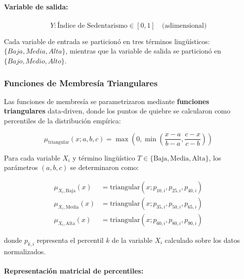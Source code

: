 \paragraph{Variable de salida:}
\begin{equation}
Y: \text{Índice de Sedentarismo} \in [0, 1] \quad \text{(adimensional)}
\label{eq:var_salida}
\end{equation}

Cada variable de entrada se particionó en tres términos lingüísticos: \(\{Baja, Media, Alta\}\), mientras que la variable de salida se particionó en \(\{Bajo, Medio, Alto\}\).

\subsubsection{Funciones de Membresía Triangulares}
\label{subsubsec:funciones_membresia}

Las funciones de membresía se parametrizaron mediante \textbf{funciones triangulares} data-driven, donde los puntos de quiebre se calcularon como percentiles de la distribución empírica:

\begin{equation}
\mu_{\text{triangular}}(x; a, b, c) = \max\left(0, \min\left(\frac{x - a}{b - a}, \frac{c - x}{c - b}\right)\right)
\label{eq:func_triangular}
\end{equation}

Para cada variable \(X_i\) y término lingüístico \(T \in \{\text{Baja}, \text{Media}, \text{Alta}\}\), los parámetros \((a, b, c)\) se determinaron como:

\begin{align}
\mu_{X_i, \text{Baja}}(x) &= \text{triangular}(x; p_{10,i}, p_{25,i}, p_{40,i}) \label{eq:mf_baja} \\
\mu_{X_i, \text{Media}}(x) &= \text{triangular}(x; p_{35,i}, p_{50,i}, p_{65,i}) \label{eq:mf_media} \\
\mu_{X_i, \text{Alta}}(x) &= \text{triangular}(x; p_{60,i}, p_{80,i}, p_{90,i}) \label{eq:mf_alta}
\end{align}

donde \(p_{k,i}\) representa el percentil \(k\) de la variable \(X_i\) calculado sobre los datos normalizados.

\paragraph{Representación matricial de percentiles:}

